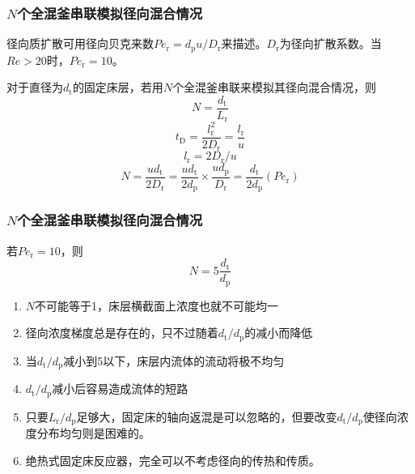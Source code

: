 \documentclass[dvipsnames, svgnames, x11names]{beamer}
\begin{document}
\begin{frame}
    \frametitle{$N$个全混釜串联模拟径向混合情况}
    径向质扩散可用径向贝克来数$Pe_\mathrm{r}=d_\mathrm{p}u/D_\mathrm{r}$来描述。$D_\mathrm{r}$为径向扩散系数。当$Re>20$时，$Pe_\mathrm{r}=10$。

    对于直径为$d_\mathrm{t}$的固定床层，若用$N$个全混釜串联来模拟其径向混合情况，则
    \[
        N = \frac{d_\mathrm{t}}{L_\mathrm{r}}
    \]
    \[
        t_\mathrm{D} = \frac{l_\mathrm{r}^2}{2D_\mathrm{r}} = \frac{l_\mathrm{r}}{u}
    \]
    \[
        l_\mathrm{r} = 2D_\mathrm{r}/u
    \]
    \[
        N = \frac{ud_\mathrm{t}}{2D_\mathrm{r}} = \frac{ud_\mathrm{t}}{2d_\mathrm{p}}\times \frac{ud_\mathrm{p}}{D_\mathrm{r}} = \frac{d_\mathrm{t}}{2d_\mathrm{p}}(P e_\mathrm{r})
    \]
\end{frame}


\begin{frame}
    \frametitle{$N$个全混釜串联模拟径向混合情况}
    若$Pe_\mathrm{r}=10$，则
    \[
        N = 5\frac{d_\mathrm{t}}{d_\mathrm{p}}
    \]
    \vspace{-1em}
    \begin{enumerate}
      \item $N$不可能等于1，床层横截面上浓度也就不可能均一
      \item 径向浓度梯度总是存在的，只不过随着$d_\mathrm{t}/d_\mathrm{p}$的减小而降低
      \item 当$d_\mathrm{t}/d_\mathrm{p}$减小到5以下，床层内流体的流动将极不均匀
      \item $d_\mathrm{t}/d_\mathrm{p}$减小后容易造成流体的短路
      \item 只要$L_\mathrm{r}/d_\mathrm{p}$足够大，固定床的轴向返混是可以忽略的，但要改变$d_\mathrm{t}/d_\mathrm{p}$使径向浓度分布均匀则是困难的。
      \item 绝热式固定床反应器，完全可以不考虑径向的传热和传质。
    \end{enumerate}
\end{frame}









	
\end{document}
